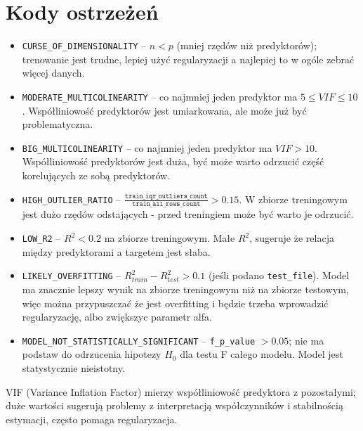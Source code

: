 \documentclass[12pt,a4paper]{article}
\begin{document}
\section{Kody ostrzeżeń}
\begin{itemize}
    \item \texttt{CURSE\_OF\_DIMENSIONALITY} – \(n < p\) (mniej rzędów niż predyktorów); trenowanie jest trudne, lepiej użyć regularyzacji a najlepiej to w ogóle zebrać więcej danych.
    \item \texttt{MODERATE\_MULTICOLINEARITY} – co najmniej jeden predyktor ma \(5 \le VIF \le 10\). Współliniowość predyktorów jest umiarkowana, ale może już być problematyczna.
    \item \texttt{BIG\_MULTICOLINEARITY} – co najmniej jeden predyktor ma \(VIF > 10\). Współliniowość predyktorów jest duża, być może warto odrzucić część korelujących ze sobą predyktorów.
    \item \texttt{HIGH\_OUTLIER\_RATIO} – \(\frac{\texttt{train\_iqr\_outliers\_count}}{\texttt{train\_all\_rows\_count}} > 0.15\). W zbiorze treningowym jest dużo rzędów odstających - przed treningiem może być warto je odrzucić.
    \item \texttt{LOW\_R2} – \(R^2 < 0.2\) na zbiorze treningowym. Małe \(R^2\), sugeruje że relacja między predyktorami a targetem jest słaba.
    \item \texttt{LIKELY\_OVERFITTING} – \(R^2_{train} - R^2_{test} > 0.1\) (jeśli podano \texttt{test\_file}). Model ma znacznie lepszy wynik na zbiorze treningowym niż na zbiorze testowym, więc można przypuszczać że jest overfitting i będzie trzeba wprowadzić regularyzację, albo zwiększyc parametr alfa.
    \item \texttt{MODEL\_NOT\_STATISTICALLY\_SIGNIFICANT} – \texttt{f\_p\_value} \(> 0.05\); nie ma podstaw do odrzucenia hipotezy \(H_0\) dla testu F całego modelu. Model jest statystycznie nieistotny.
\end{itemize}

VIF (Variance Inflation Factor) mierzy współliniowość predyktora z pozostałymi; duże wartości sugerują problemy z interpretacją współczynników i stabilnością estymacji, często pomaga regularyzacja.
\end{document}

